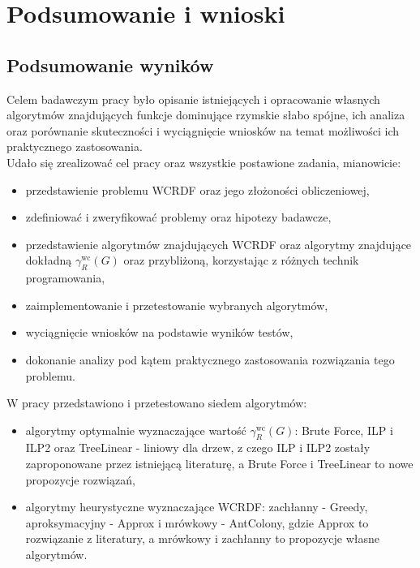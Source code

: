 \chapter{Podsumowanie i wnioski}

\section{Podsumowanie wyników}

Celem badawczym pracy było opisanie istniejących i opracowanie własnych algorytmów znajdujących funkcje dominujące rzymskie słabo spójne, ich analiza oraz porównanie skuteczności i wyciągnięcie wniosków na temat możliwości ich praktycznego zastosowania.\\
Udało się zrealizować cel pracy oraz wszystkie postawione zadania, mianowicie:
\begin{itemize}
    \item przedstawienie problemu WCRDF oraz jego złożoności obliczeniowej,
    \item zdefiniować i zweryfikować problemy oraz hipotezy badawcze,
    \item przedstawienie algorytmów znajdujących WCRDF oraz algorytmy znajdujące dokładną $\gamma^{\text{wc}}_R(G)$ oraz przybliżoną, korzystając z różnych technik programowania,
    \item zaimplementowanie i przetestowanie wybranych algorytmów,
    \item wyciągnięcie wniosków na podstawie wyników testów,
    \item dokonanie analizy pod kątem praktycznego zastosowania rozwiązania tego problemu.
\end{itemize}
W pracy przedstawiono i przetestowano siedem algorytmów:
\begin{itemize}
    \item algorytmy optymalnie wyznaczające wartość $\gamma^{\text{wc}}_R(G)$: Brute Force, ILP i ILP2 oraz TreeLinear - liniowy dla drzew, z czego ILP i ILP2 zostały zaproponowane przez istniejącą literaturę, a Brute Force i TreeLinear to nowe propozycje rozwiązań,
    \item algorytmy heurystyczne wyznaczające WCRDF: zachłanny - Greedy, aproksymacyjny - Approx i mrówkowy - AntColony, gdzie Approx to rozwiązanie z literatury, a mrówkowy i zachłanny to propozycje własne algorytmów.
\end{itemize}

